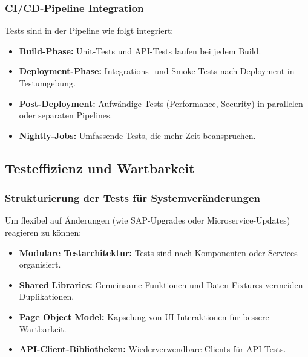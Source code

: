 \subsubsection{CI/CD-Pipeline Integration}
Tests sind in der Pipeline wie folgt integriert:
\begin{itemize}
    \item \textbf{Build-Phase:} Unit-Tests und API-Tests laufen bei jedem Build.
    \item \textbf{Deployment-Phase:} Integrations- und Smoke-Tests nach Deployment in Testumgebung.
    \item \textbf{Post-Deployment:} Aufwändige Tests (Performance, Security) in parallelen oder separaten Pipelines.
    \item \textbf{Nightly-Jobs:} Umfassende Tests, die mehr Zeit beanspruchen.
\end{itemize}
\subsection{Testeffizienz und Wartbarkeit}
\subsubsection{Strukturierung der Tests für Systemveränderungen}
Um flexibel auf Änderungen (wie SAP-Upgrades oder Microservice-Updates) reagieren zu können:
\begin{itemize}
    \item \textbf{Modulare Testarchitektur:} Tests sind nach Komponenten oder Services organisiert.
    \item \textbf{Shared Libraries:} Gemeinsame Funktionen und Daten-Fixtures vermeiden Duplikationen.
    \item \textbf{Page Object Model:} Kapselung von UI-Interaktionen für bessere Wartbarkeit.
    \item \textbf{API-Client-Bibliotheken:} Wiederverwendbare Clients für API-Tests.
\end{itemize}
